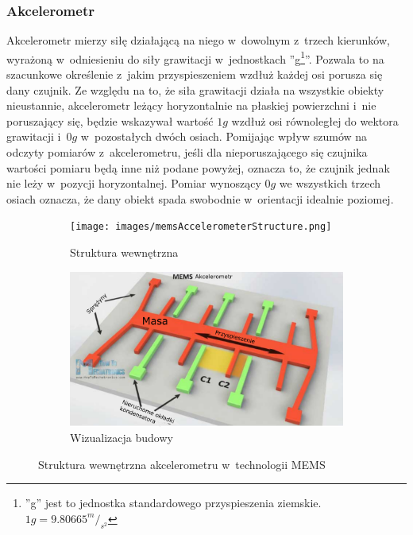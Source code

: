																																											
\subsubsection*{Akcelerometr}
Akcelerometr mierzy siłę działającą na niego w~dowolnym z~trzech kierunków, wyrażoną w~odniesieniu do siły grawitacji w~jednostkach ''g\footnote{''g'' jest to jednostka standardowego przyspieszenia ziemskie. $1g =9.80665^m/_{s^2}$ }''. Pozwala to na szacunkowe określenie z~jakim przyspieszeniem wzdłuż każdej osi porusza się dany czujnik. Ze względu na to, że siła grawitacji działa na wszystkie obiekty nieustannie, akcelerometr leżący horyzontalnie na płaskiej powierzchni i~nie poruszający się, będzie wskazywał wartość $1g$ wzdłuż osi równoległej do wektora grawitacji i~$0g$ w~pozostałych dwóch osiach. Pomijając wpływ szumów na odczyty pomiarów z~akcelerometru, jeśli dla nieporuszającego się czujnika wartości pomiaru będą inne niż podane powyżej, oznacza to, że czujnik jednak nie leży w~pozycji horyzontalnej. Pomiar wynoszący $0g$ we wszystkich trzech osiach oznacza, że dany obiekt spada swobodnie w~orientacji idealnie poziomej.
																																													
\begin{savenotes}
	\begin{figure}[!htb]
		\captionsetup{singlelinecheck=off}
		\begin{subfigure}[b]{0.45\textwidth}
			\texttt{[image: images/memsAccelerometerStructure.png]}	
			\caption[Struktura wewnętrzna akcelerometru]{Struktura wewnętrzna }
			\label{fig:characteristics:imu:acc:memsA}
		\end{subfigure}
		\hfill																																																						
		\begin{subfigure}[b]{0.45\textwidth}
			\includegraphics[width=\textwidth]{images/memsAccelerometerIdea.png}		
			\caption[Wizualizacja budowy akcelerometru]{Wizualizacja budowy }
			\label{fig:characteristics:imu:acc:memsB}
		\end{subfigure}				
		\caption{Struktura wewnętrzna akcelerometru w~technologii MEMS}
		\label{fig:characteristics:imu:acc:mems}
	\end{figure}
\end{savenotes}
																																											
